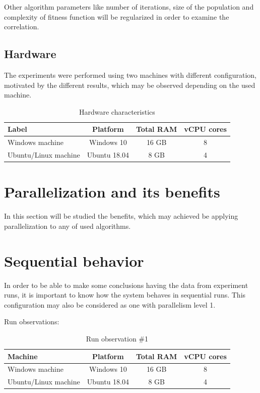 Other algorithm parameters like number of iterations, size of the population and complexity of fitness function will be regularized in order to examine the correlation.

\subsection{Hardware}

The experiments were performed using two machines with different configuration, motivated by the different results, which may be observed depending on the used machine.

\begin{table}[h]
\centering\caption{Hardware characteristics \label{tab:exp-hardware}}
\begin{tabular}{|l|c|c|c|}%
\hline
\textbf{Label} & \textbf{Platform} & \textbf{Total RAM} & \textbf{vCPU cores} \\
\hline
Windows machine & Windows 10 & 16 GB & 8 \\
\hline
Ubuntu/Linux machine & Ubuntu 18.04 & 8 GB & 4 \\
\hline
\end{tabular}
\end{table}

\section{Parallelization and its benefits}
In this section will be studied the benefits, which may achieved be applying parallelization to any of used algorithms.

\section{Sequential behavior}

In order to be able to make some conclusions having the data from experiment runs, it is important to know how the system behaves in sequential runs. This configuration may also be considered as one with parallelism level 1.

Run observations:
\begin{table}[h]
\centering\caption{Run observation \#1 \label{tab:run-1}}
\begin{tabular}{|l|c|c|c|}%
\hline
\textbf{Machine} & \textbf{Platform} & \textbf{Total RAM} & \textbf{vCPU cores} \\
\hline
Windows machine & Windows 10 & 16 GB & 8 \\
\hline
Ubuntu/Linux machine & Ubuntu 18.04 & 8 GB & 4 \\
\hline
\end{tabular}
\end{table}

